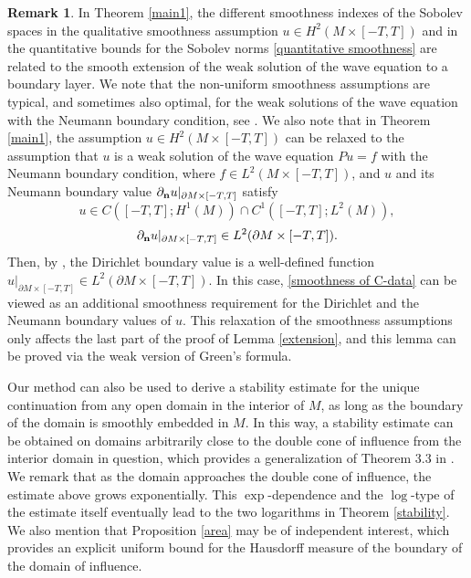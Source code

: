 \documentclass[11pt,letterpaper]{amsart}
\numberwithin{equation}{section}
\theoremstyle{definition}
\theoremstyle{plain}
\theoremstyle{definition}
\theoremstyle{plain}
\theoremstyle{definition}
\newtheorem{remark}[remark0]{Remark}
\theoremstyle{plain}
\begin{document}
\begin{remark}
In Theorem \ref{main1}, the different smoothness indexes of the Sobolev spaces in the qualitative smoothness assumption $u\in H^2(M\times [-T,T])$ and  in the quantitative bounds for the Sobolev norms \eqref{quantitative smoothness} are related to the smooth extension of the weak solution of the wave equation to a boundary layer. We note that the non-uniform smoothness assumptions
are typical, and sometimes also optimal, for the weak solutions of the wave equation with the Neumann boundary condition, see \cite{LT}.
We also note that in Theorem \ref{main1}, the assumption $u\in H^2(M\times [-T,T])$  can be relaxed to 
the assumption that  $u$ is a weak solution of the wave equation $Pu=f$ with the Neumann boundary condition, where $f\in L^2(M \times [-T,T])$, and $u$ and its Neumann boundary value $\partial_{\bf n}u|_{\partial M \times [-T,T]}$
satisfy 
$$u \in C([-T,T];H^1(M))\cap C^1([-T,T];L^2(M)),$$ 
$$\partial_{\bf n}u|_{\partial M \times [-T,T]}\in L^2(\partial M \times [-T,T]).$$
Then, by \cite[Thm.\ A]{LT},  the Dirichlet boundary value is a well-defined function
$u|_{\partial M \times [-T,T]}\in L^2(\partial M \times [-T,T])$. In this case,
\eqref{smoothness of C-data} can be viewed as an additional smoothness requirement
for the Dirichlet and the Neumann boundary values of $u$.
This relaxation of the smoothness assumptions only affects the last part of the proof of  Lemma \ref{extension}, and this lemma can be proved via the weak version of Green's formula.
\end{remark}

Our method can also be used to derive a stability estimate for the unique continuation from any open domain in the interior of $M$, as long as the boundary of the domain is smoothly embedded in $M$. In this way, a stability estimate can be obtained on domains arbitrarily close to the double cone of influence from the interior domain in question, which provides a generalization of Theorem 3.3 in \cite{BKL2}. We remark that as the domain approaches the double cone of influence, the estimate above grows exponentially. This $\exp$-dependence and the $\log$-type of the estimate itself eventually lead to the two logarithms in Theorem \ref{stability}. We also mention that Proposition \ref{area} may be of independent interest, which provides an explicit uniform bound for the Hausdorff measure of the boundary of the domain of influence.
\end{document}
